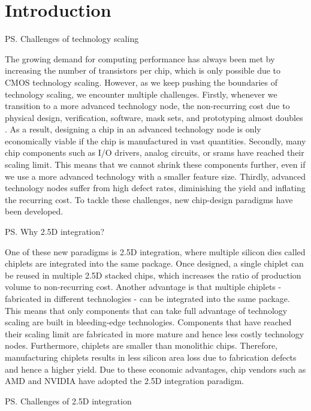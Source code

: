 \section{Introduction}
\label{sec:intro}


\ps{Challenges of technology scaling}

The growing demand for computing performance has always been met by increasing the number of transistors per chip, which is only possible due to CMOS technology scaling.
However, as we keep pushing the boundaries of technology scaling, we encounter multiple challenges.
Firstly, whenever we transition to a more advanced technology node, the non-recurring cost due to physical design, verification, software, mask sets, and prototyping almost doubles \cite{cost-tech-node}.
As a result, designing a chip in an advanced technology node is only economically viable if the chip is manufactured in vast quantities.
Secondly, many chip components such as I/O drivers, analog circuits, or \gls{srams} have reached their scaling limit.
This means that we cannot shrink these components further, even if we use a more advanced technology with a smaller feature size.
Thirdly, advanced technology nodes suffer from high defect rates, diminishing the yield and inflating the recurring cost.
To tackle these challenges, new chip-design paradigms have been developed.

\ps{Why 2.5D integration?}

One of these new paradigms is 2.5D integration, where multiple silicon dies called chiplets are integrated into the same package.
Once designed, a single chiplet can be reused in multiple 2.5D stacked chips, which increases the ratio of production volume to non-recurring cost.
Another advantage is that multiple chiplets - fabricated in different technologies - can be integrated into the same package.
This means that only components that can take full advantage of technology scaling are built in bleeding-edge technologies.
Components that have reached their scaling limit are fabricated in more mature and hence less costly technology nodes.
Furthermore, chiplets are smaller than monolithic chips.
Therefore, manufacturing chiplets results in less silicon area loss due to fabrication defects and hence a higher yield.
Due to these economic advantages, chip vendors such as AMD \cite{amd-chiplet} and NVIDIA \cite{chiplet-book} have adopted the 2.5D integration paradigm.  

\ps{Challenges of 2.5D integration}

